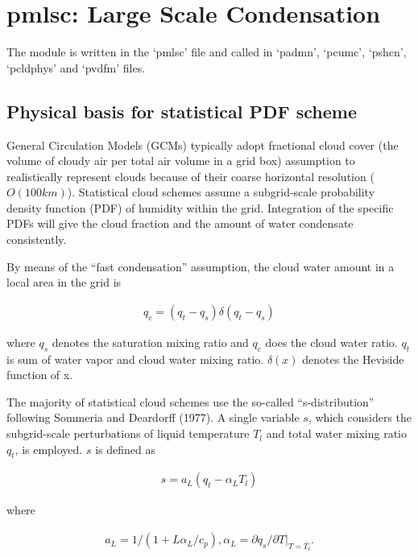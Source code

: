 \hypertarget{pmlsc-large-scale-condensation}{%
\section{pmlsc: Large Scale
Condensation}\label{pmlsc-large-scale-condensation}}

The module is written in the `pmlsc' file and called in `padmn',
`pcumc', `pshcn', `pcldphys' and `pvdfm' files.

\hypertarget{physical-basis-for-statistical-pdf-scheme}{%
\subsection{Physical basis for statistical PDF
scheme}\label{physical-basis-for-statistical-pdf-scheme}}

General Circulation Models (GCMs) typically adopt fractional cloud cover
(the volume of cloudy air per total air volume in a grid box) assumption
to realistically represent clouds because of their coarse horizontal
resolution (\(O(100km)\)). Statistical cloud schemes assume a
subgrid‐scale probability density function (PDF) of humidity within the
grid. Integration of the specific PDFs will give the cloud fraction and
the amount of water condensate consistently.

By means of the ``fast condensation'' assumption, the cloud water amount
in a local area in the grid is

\begin{eqnarray}
q_{c}=\left(q_{t}-q_{s}\right) \delta\left(q_{t}-q_{s}\right)
\label{hpc.1}
\end{eqnarray}

where \(q_s\) denotes the saturation mixing ratio and \(q_c\) does the
cloud water ratio. \(q_t\) is sum of water vapor and cloud water mixing
ratio. \(\delta(x)\) denotes the Heviside function of x.

The majority of statistical cloud schemes use the so-called
``s-distribution'' following Sommeria and Deardorff (1977). A single
variable \(s\), which considers the subgrid-scale perturbations of
liquid temperature \(T_l\) and total water mixing ratio \(q_t\), is
employed. \(s\) is defined as

\begin{eqnarray}
s=a_{L}\left(q_{t}-\alpha_{L} T_{l}\right)
\end{eqnarray}

where

\begin{eqnarray}
a_{L}=1 /\left(1+L \alpha_{L} / c_{p}\right), \alpha_{L}=\partial q_{s} /\left.\partial T\right|_{T=\bar{T_l}}.
\end{eqnarray}

